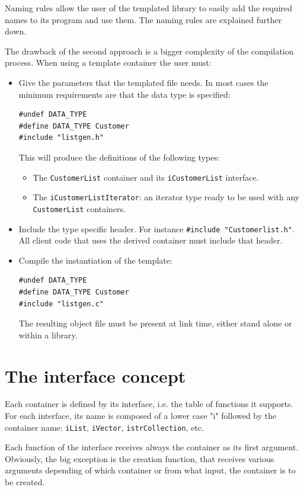 \documentclass[12pt,a4paper,openany]{memoir} %
\begin{document}
Naming rules allow the user of the templated library to easily add
the required names to its program and use them. The naming rules are explained further down.

The drawback of the second approach is a bigger complexity of the compilation process. When using a template container the user must:
\begin{itemize}
\item Give the parameters that the templated file needs. In most cases the minimum requirements are that the data type is specified:
\begin{verbatim}
#undef DATA_TYPE
#define DATA_TYPE Customer
#include "listgen.h"
\end{verbatim}

This will produce the definitions of the following types:
\begin{itemize}
\item The \verb,CustomerList, container and its \verb,iCustomerList, interface.
\item The \verb,iCustomerListIterator,: an iterator type ready to be used with any \verb,CustomerList, containers.
\end{itemize}
\item Include the type specific header. For instance \verb,#include "Customerlist.h",. All client code that uses the derived container must
include that header.
\item Compile the instantiation of the template:
\begin{verbatim}
#undef DATA_TYPE
#define DATA_TYPE Customer
#include "listgen.c"
\end{verbatim}

The resulting object file must be present at link time, either stand alone or within a library.
\end{itemize}

\section{The interface concept}
Each container is defined by its interface, i.e. the table of functions it supports. For each interface, its name is composed of a lower case "i" followed by the container name: \verb,iList,, \verb,iVector,, \verb,istrCollection,, etc.

Each function of the interface receives always the container as its first argument. Obviously, the big exception is the creation function, that receives various arguments depending of which container or from what input, the container is to be created.
\end{document}

